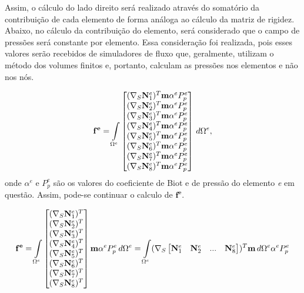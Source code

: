 Assim, o cálculo do lado direito será realizado através do somatório da contribuição de cada elemento de forma análoga ao cálculo da matriz de rigidez. Abaixo, no cálculo da contribuição do elemento, será considerado que o campo de pressões será constante por elemento. Essa consideração foi realizada, pois esses valores serão recebidos de simuladores de fluxo que, geralmente, utilizam o método dos volumes finitos e, portanto, calculam as pressões nos elementos e não nos nós.

\begin{equation}
    \mathbf{f^e} = \omeeint{\begin{bmatrix}
(\sopnabla \basefunctionelem[1])^T \mathbf{m} \alpha^e P^e_p
\\
(\sopnabla \basefunctionelem[2])^T \mathbf{m} \alpha^e P^e_p
\\
(\sopnabla \basefunctionelem[3])^T \mathbf{m} \alpha^e P^e_p
\\
(\sopnabla \basefunctionelem[4])^T \mathbf{m} \alpha^e P^e_p
\\
(\sopnabla \basefunctionelem[5])^T \mathbf{m} \alpha^e P^e_p
\\
(\sopnabla \basefunctionelem[6])^T \mathbf{m} \alpha^e P^e_p
\\
(\sopnabla \basefunctionelem[7])^T \mathbf{m} \alpha^e P^e_p
\\
(\sopnabla \basefunctionelem[8])^T \mathbf{m} \alpha^e P^e_p
\end{bmatrix}},
\end{equation}
onde $\alpha^e$ e $P^e_p$ são os valores do coeficiente de Biot e de pressão do elemento \textit{e} em questão. Assim, pode-se continuar o calculo de $\mathbf{f^e}$.


\begin{equation}
\mathbf{f^e} = \omeeint{\begin{bmatrix}
(\sopnabla \basefunctionelem[1])^T
\\
(\sopnabla \basefunctionelem[2])^T
\\
(\sopnabla \basefunctionelem[3])^T
\\
(\sopnabla \basefunctionelem[4])^T
\\
(\sopnabla \basefunctionelem[5])^T
\\
(\sopnabla \basefunctionelem[6])^T
\\
(\sopnabla \basefunctionelem[7])^T
\\
(\sopnabla \basefunctionelem[8])^T
\end{bmatrix} \mathbf{m} \alpha^e P^e_p }
 = \omeeint{(\sopnabla  \begin{bmatrix} \basefunctionelem[1] & \basefunctionelem[2] & ... & \basefunctionelem[8]\end{bmatrix} )^T \mathbf{m}} \alpha^e P^e_p
\end{equation}


